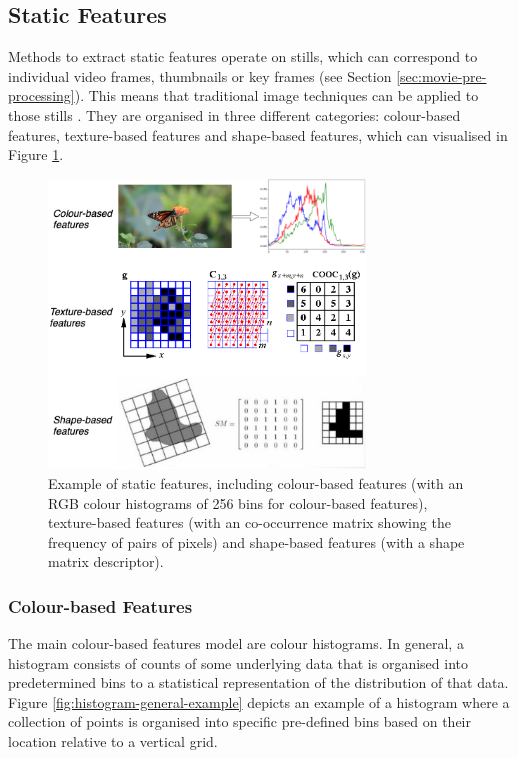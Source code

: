 \subsection{Static Features}

Methods to extract static features operate on stills, which can correspond to individual video frames, thumbnails or key frames (see Section \ref{sec:movie-pre-processing}). This means that traditional image techniques can be applied to those stills \cite{hu2011survey}. They are organised in three different categories: colour-based features, texture-based features and shape-based features, which can visualised in Figure \ref{fig:colour-texture-shape-features}.

\begin{figure}[h]
\centerline{\includegraphics[width=0.75\textwidth]{figures/colour-texture-shape-features.png}}
\caption{\label{fig:colour-texture-shape-features}Example of static features, including colour-based features (with an RGB colour histograms of 256 bins for colour-based features), texture-based features (with an co-occurrence matrix showing the frequency of pairs of pixels) and shape-based features (with a shape matrix descriptor).}
\end{figure}

\subsubsection{Colour-based Features}
\label{sec:color-based-features}

The main colour-based features model are colour histograms. In general, a histogram consists of counts of some underlying data that is organised into predetermined bins to a statistical representation of the distribution of that data. Figure \ref{fig:histogram-general-example} depicts an example of a histogram where a collection of points is organised into specific pre-defined bins based on their location relative to a vertical grid.

